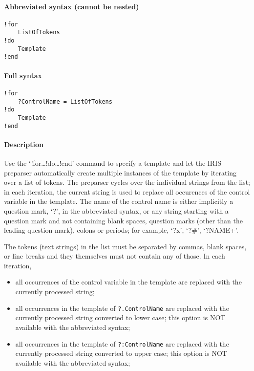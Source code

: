 


	\paragraph{Abbreviated syntax (cannot be
nested)}\label{abbreviated-syntax-cannot-be-nested}

\begin{verbatim}
!for
    ListOfTokens
!do
    Template
!end
\end{verbatim}

\paragraph{Full syntax}\label{full-syntax}

\begin{verbatim}
!for
    ?ControlName = ListOfTokens
!do
    Template
!end
\end{verbatim}

\paragraph{Description}\label{description}

Use the `!for\ldots{}!do\ldots{}!end' command to specify a template and
let the IRIS preparser automatically create multiple instances of the
template by iterating over a list of tokens. The preparser cycles over
the individual strings from the list; in each iteration, the current
string is used to replace all occurences of the control variable in the
template. The name of the control name is either implicitly a question
mark, `?', in the abbreviated syntax, or any string starting with a
question mark and not containing blank spaces, question marks (other
than the leading question mark), colons or periods; for example, `?x',
`?\#', `?NAME+'.

The tokens (text strings) in the list must be separated by commas, blank
spaces, or line breaks and they themselves must not contain any of
those. In each iteration,

\begin{itemize}
\item
  all occurrences of the control variable in the template are replaced
  with the currently processed string;
\item
  all occurrences in the template of \texttt{?.ControlName} are replaced
  with the currently processed string converted to lower case; this
  option is NOT available with the abbreviated syntax;
\item
  all occurrences in the template of \texttt{?:ControlName} are replaced
  with the currently processed string converted to upper case; this
  option is NOT available with the abbreviated syntax;
\end{itemize}

